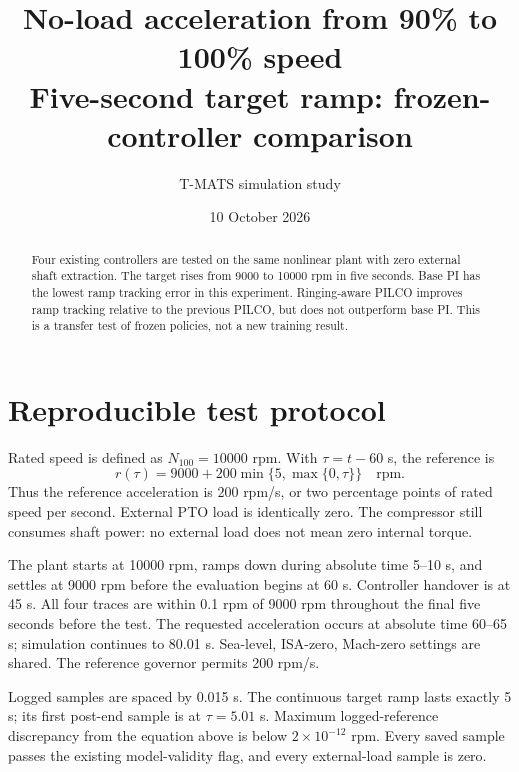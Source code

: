 \documentclass[11pt,a4paper]{article}
\title{No-load acceleration from 90\% to 100\% speed\\Five-second target ramp: frozen-controller comparison}
\author{T-MATS simulation study}\date{10 October 2026}
\begin{document}
\maketitle
\begin{abstract}Four existing controllers are tested on the same nonlinear plant with zero external shaft extraction. The target rises from 9000 to 10000 rpm in five seconds. Base PI has the lowest ramp tracking error in this experiment. Ringing-aware PILCO improves ramp tracking relative to the previous PILCO, but does not outperform base PI. This is a transfer test of frozen policies, not a new training result.\end{abstract}
\section{Reproducible test protocol}
Rated speed is defined as $N_{100}=10000$ rpm. With $\tau=t-60$ s, the reference is
\begin{equation}r(\tau)=9000+200\min\{5,\max\{0,\tau\}\}\quad\text{rpm}.\end{equation}
Thus the reference acceleration is $200$ rpm/s, or two percentage points of rated speed per second. External PTO load is identically zero. The compressor still consumes shaft power: no external load does not mean zero internal torque.

The plant starts at 10000 rpm, ramps down during absolute time 5--10 s, and settles at 9000 rpm before the evaluation begins at 60 s. Controller handover is at 45 s. All four traces are within 0.1 rpm of 9000 rpm throughout the final five seconds before the test. The requested acceleration occurs at absolute time 60--65 s; simulation continues to 80.01 s. Sea-level, ISA-zero, Mach-zero settings are shared. The reference governor permits 200 rpm/s.

Logged samples are spaced by 0.015 s. The continuous target ramp lasts exactly 5 s; its first post-end sample is at $\tau=5.01$ s. Maximum logged-reference discrepancy from the equation above is below $2\times10^{-12}$ rpm. Every saved sample passes the existing model-validity flag, and every external-load sample is zero.
\end{document}
